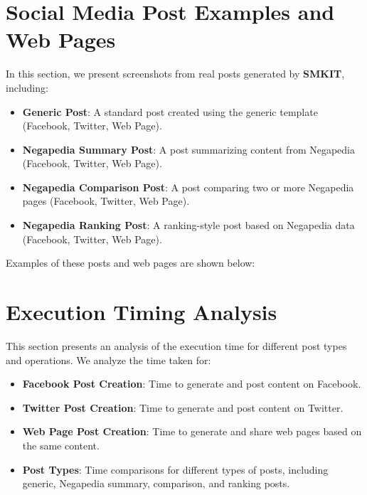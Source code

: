 \section{Social Media Post Examples and Web Pages}
\label{sec:social_media_post_examples}
In this section, we present screenshots from real posts generated by \textbf{SMKIT}, including:
\begin{itemize}
    \item \textbf{Generic Post}: A standard post created using the generic template (Facebook, Twitter, Web Page).
    \item \textbf{Negapedia Summary Post}: A post summarizing content from Negapedia (Facebook, Twitter, Web Page).
    \item \textbf{Negapedia Comparison Post}: A post comparing two or more Negapedia pages (Facebook, Twitter, Web Page).
    \item \textbf{Negapedia Ranking Post}: A ranking-style post based on Negapedia data (Facebook, Twitter, Web Page).
\end{itemize}
Examples of these posts and web pages are shown below:


\section{Execution Timing Analysis}
\label{sec:execution_timing}
This section presents an analysis of the execution time for different post types and operations. We analyze the time taken for:
\begin{itemize}
    \item \textbf{Facebook Post Creation}: Time to generate and post content on Facebook.
    \item \textbf{Twitter Post Creation}: Time to generate and post content on Twitter.
    \item \textbf{Web Page Post Creation}: Time to generate and share web pages based on the same content.
    \item \textbf{Post Types}: Time comparisons for different types of posts, including generic, Negapedia summary, comparison, and ranking posts.
\end{itemize}


